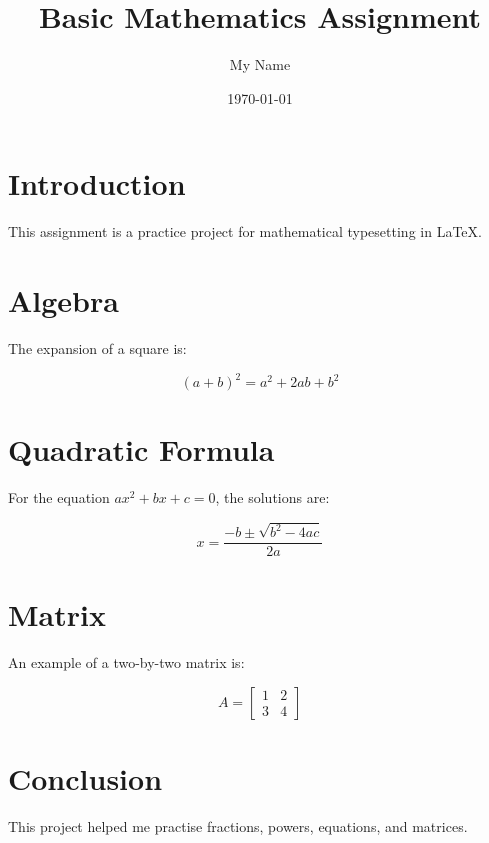 \documentclass[12pt,a4paper]{article}
\title{Basic Mathematics Assignment}
\author{My Name}
\date{\today}
\begin{document}
\maketitle

\section{Introduction}
This assignment is a practice project for mathematical typesetting in LaTeX.

\section{Algebra}
The expansion of a square is:

\[
(a+b)^2 = a^2 + 2ab + b^2
\]

\section{Quadratic Formula}
For the equation $ax^2+bx+c=0$, the solutions are:

\[
x = \frac{-b \pm \sqrt{b^2-4ac}}{2a}
\]

\section{Matrix}
An example of a two-by-two matrix is:

\[
A =
\begin{bmatrix}
1 & 2 \\
3 & 4
\end{bmatrix}
\]

\section{Conclusion}
This project helped me practise fractions, powers, equations, and matrices.
\end{document}
